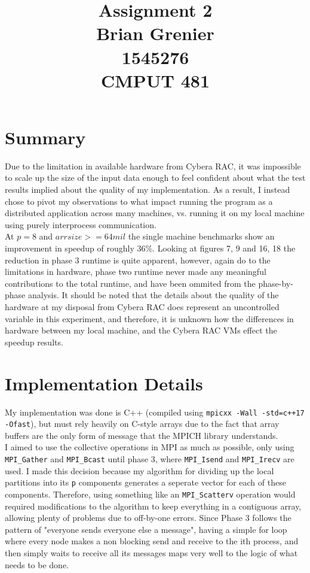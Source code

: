 \documentclass[11pt]{report}
\title{Assignment 2
\\Brian Grenier
\\1545276
\\CMPUT 481}
\begin{document}
\maketitle

\section*{Summary}
Due to the limitation in available hardware from Cybera RAC, it was impossible to scale up the size of
the input data enough to feel confident about what the test results implied about the quality of my
implementation. As a result, I instead chose to pivot my observations to what impact running the program 
as a distributed application across many machines, vs. running it on my local machine using purely
interprocess communication.\\
At $p=8$ and $arrsize>=64mil$ the single machine benchmarks show an improvement in speedup of
roughly 36\%. Looking at figures 7, 9 and 16, 18 the reduction in phase 3 runtime is quite apparent, however, again do to the limitations in hardware, phase two runtime never made any meaningful contributions to the total runtime, and have been ommited from the phase-by-phase analysis. It should be noted that the details about the quality of the hardware at my disposal from Cybera RAC does represent
an uncontrolled variable in this experiment, and therefore, it is unknown how the differences in hardware
between my local machine, and the Cybera RAC VMs effect the speedup results.


\section*{Implementation Details}
My implementation was done is C++ (compiled using \verb|mpicxx -Wall -std=c++17 -Ofast|), but must rely heavily on C-style arrays due to
the fact that array buffers are the only form of message that the MPICH library 
understands.\\
I aimed to use the collective operations in MPI as much as possible, only using \verb|MPI_Gather| and \verb|MPI_Bcast| until phase 3, where \verb|MPI_Isend| and \verb|MPI_Irecv| are used. I made this decision because my algorithm for dividing
up the local partitions into its \verb|p| components generates a seperate vector
for each of these components. Therefore, using something like an \verb|MPI_Scatterv| operation would required modifications to the algorithm to keep everything in a contiguous array, allowing plenty of problems due to off-by-one errors. Since Phase 3 follows the pattern of "everyone sends everyone else a message", having a simple for loop where every node makes a non blocking send and receive to the ith process, and then simply waits to receive all its messages maps very well to the logic of what needs to be done.
\end{document}

